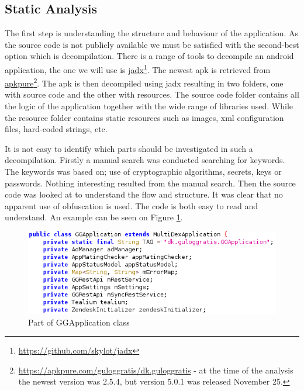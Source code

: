 \subsection{Static Analysis}
The first step is understanding the structure and behaviour of the application. As the source code is not publicly available we must be satisfied with the second-best option which is decompilation. There is a range of tools to decompile an android application, the one we will use is \href{https://github.com/skylot/jadx}{jadx}\footnote{\href{https://github.com/skylot/jadx}{https://github.com/skylot/jadx}}. The newest apk is retrieved from \href{https://apkpure.com/guloggratis/dk.guloggratis}{apkpure}\footnote{\href{https://apkpure.com/guloggratis/dk.guloggratis}{https://apkpure.com/guloggratis/dk.guloggratis} - at the time of the analysis the newest version was 2.5.4, but version 5.0.1 was released November 25. }. The apk is then decompiled using jadx resulting in two folders, one with source code and the other with resources. The source code folder contains all the logic of the application together with the wide range of libraries used. While the resource folder contains static resources such as images, xml configuration files, hard-coded strings, etc.

It is not easy to identify which parts should be investigated in such a decompilation. Firstly a manual search was conducted searching for keywords. The keywords was based on; use of cryptographic algorithms, secrets, keys or passwords. Nothing interesting resulted from the manual search. Then the source code  was looked at to understand the flow and structure. It was clear that no apparent use of obfuscation is used. The code is both easy to read and understand. An example can be seen on Figure \ref{fig:ggapplication-properties}. 

\begin{figure}[htbp]
    \centering
    \includegraphics[width=1\columnwidth]{../static-analysis/pictures/GGApplication_properties.png}
    \caption{Part of GGApplication class}
    \label{fig:ggapplication-properties}
\end{figure}

